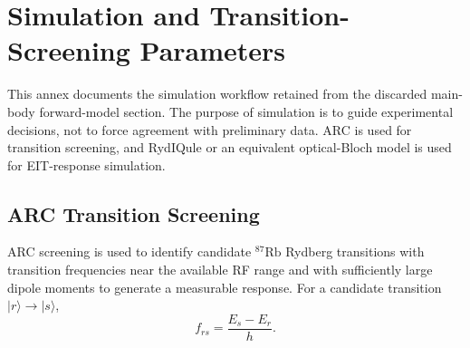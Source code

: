 \documentclass{ieeeaccess}
\begin{document}
\section{Simulation and Transition-Screening Parameters}
\label{annex:simulation_parameters}

This annex documents the simulation workflow retained from the discarded main-body forward-model section. The purpose of simulation is to guide experimental decisions, not to force agreement with preliminary data. ARC is used for transition screening, and RydIQule or an equivalent optical-Bloch model is used for EIT-response simulation.

\subsection{ARC Transition Screening}
\label{annex:arc_candidates}

ARC screening is used to identify candidate \(^{87}\mathrm{Rb}\) Rydberg transitions with transition frequencies near the available RF range and with sufficiently large dipole moments to generate a measurable response. For a candidate transition \(|r\rangle\rightarrow|s\rangle\),
\begin{equation}
f_{rs}
=
\frac{E_s-E_r}{h}.
\label{eq:annex_arc_transition_frequency}
\end{equation}
\end{document}
